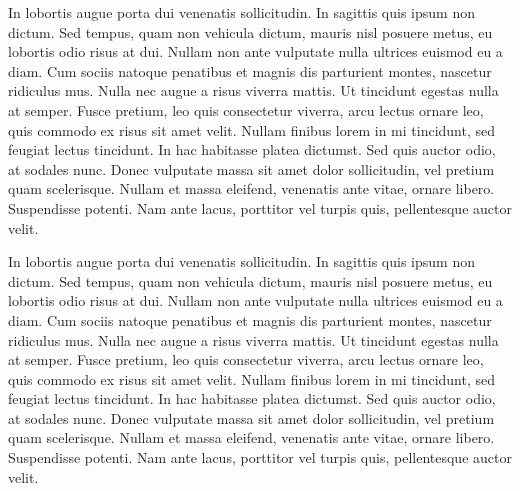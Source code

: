 In lobortis augue porta dui venenatis sollicitudin. In sagittis quis ipsum non dictum. Sed tempus, quam non vehicula dictum, mauris nisl posuere metus, eu lobortis odio risus at dui. Nullam non ante vulputate nulla ultrices euismod eu a diam. Cum sociis natoque penatibus et magnis dis parturient montes, nascetur ridiculus mus. Nulla nec augue a risus viverra mattis. Ut tincidunt egestas nulla at semper. Fusce pretium, leo quis consectetur viverra, arcu lectus ornare leo, quis commodo ex risus sit amet velit. Nullam finibus lorem in mi tincidunt, sed feugiat lectus tincidunt. In hac habitasse platea dictumst. Sed quis auctor odio, at sodales nunc. Donec vulputate massa sit amet dolor sollicitudin, vel pretium quam scelerisque. Nullam et massa eleifend, venenatis ante vitae, ornare libero. Suspendisse potenti. Nam ante lacus, porttitor vel turpis quis, pellentesque auctor velit.

In lobortis augue porta dui venenatis sollicitudin. In sagittis quis ipsum non dictum. Sed tempus, quam non vehicula dictum, mauris nisl posuere metus, eu lobortis odio risus at dui. Nullam non ante vulputate nulla ultrices euismod eu a diam. Cum sociis natoque penatibus et magnis dis parturient montes, nascetur ridiculus mus. Nulla nec augue a risus viverra mattis. Ut tincidunt egestas nulla at semper. Fusce pretium, leo quis consectetur viverra, arcu lectus ornare leo, quis commodo ex risus sit amet velit. Nullam finibus lorem in mi tincidunt, sed feugiat lectus tincidunt. In hac habitasse platea dictumst. Sed quis auctor odio, at sodales nunc. Donec vulputate massa sit amet dolor sollicitudin, vel pretium quam scelerisque. Nullam et massa eleifend, venenatis ante vitae, ornare libero. Suspendisse potenti. Nam ante lacus, porttitor vel turpis quis, pellentesque auctor velit.




